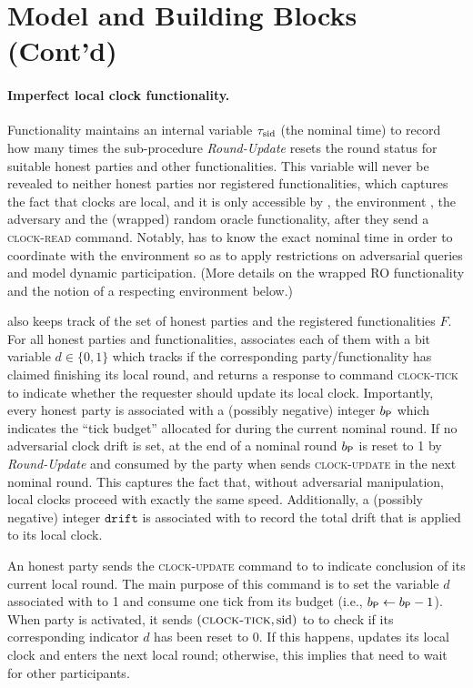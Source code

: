 \section{Model and Building Blocks (Cont'd)}
\label{section:model-contd}

\paragraph{Imperfect local clock functionality.}
%
Functionality \funcImpClock maintains an internal variable $\tau_\mathrm{sid}$ (the nominal time) to record how many times the sub-procedure \textit{Round-Update} resets the round status for suitable honest parties and other functionalities.
%
This variable will never be revealed to neither honest parties nor registered
functionalities, which captures the fact that clocks are local, and it is only
accessible by \funcImpClock, the environment \Z, the adversary \adv and the (wrapped) random oracle functionality\wrapper{\funcRO}, after they send a \textsc{clock-read} command.
%
Notably, \wrapper{\funcRO} has to know the exact nominal time in order to coordinate with the environment so as to apply restrictions on adversarial queries and model dynamic participation.
%
(More details on the wrapped RO functionality and the notion of a respecting environment below.)

\funcImpClock also keeps track of the set of honest parties \partyset and the registered functionalities $F$.
%
For all honest parties and functionalities, \funcImpClock associates each of them with a bit variable $d \in \{0, 1\}$ which tracks if the corresponding party/functionality has claimed finishing its local round, and returns a response to command \textsc{clock-tick} to indicate whether the requester should update its local clock.
%
Importantly, every honest party \party is associated with a (possibly negative) integer $b_\mathsf{P}$ which indicates the ``tick budget'' allocated for \party during the current nominal round.
%
If no adversarial clock drift is set, at the end of a nominal round $b_\mathsf{P}$ is reset to 1 by \textit{Round-Update} and consumed by the party when \party sends \textsc{clock-update} in the next nominal round.
%
This captures the fact that, without adversarial manipulation, local clocks proceed with exactly the same speed.
%
Additionally, a (possibly negative) integer $\mathtt{drift}$ is associated with \party to record the total drift that is applied to its local clock.

An honest party \party sends the \textsc{clock-update} command to \funcImpClock to indicate conclusion of its current local round.
%
The main purpose of this command is to set the variable $d$ associated with \party to 1 and consume one tick from its budget (i.e., $b_\mathsf{P} \gets b_\mathsf{P} - 1$).
%
When party \party is activated, it sends $(\textsc{clock-tick}, \mathrm{sid})$ to \funcImpClock to check if its corresponding indicator $d$ has been reset to 0.
%
If this happens, \party updates its local clock and enters the next local round; otherwise, this implies that \party need to wait for other participants.


